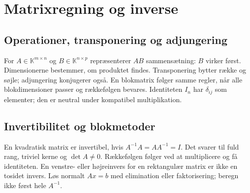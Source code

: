 \section{Matrixregning og inverse}
\subsection{Operationer, transponering og adjungering}
For $A\in\mathbb K^{m\times n}$ og $B\in\mathbb K^{n\times p}$ repræsenterer
$AB$ sammensætning: $B$ virker først. Dimensionerne bestemmer, om produktet findes.
Transponering bytter række og søjle; adjungering konjugerer også.
En blokmatrix følger samme regler, når alle blokdimensioner passer og
rækkefølgen bevares. Identiteten $I_n$ har $\delta_{ij}$ som elementer;
den er neutral under kompatibel multiplikation.

\subsection{Invertibilitet og blokmetoder}
En kvadratisk matrix er invertibel, hvis $A^{-1}A=AA^{-1}=I$.
Det svarer til fuld rang, triviel kerne og $\det A\ne0$.
Rækkefølgen følger ved at multiplicere og få identiteten.
En venstre- eller højreinvers for en rektangulær matrix er ikke en
tosidet invers. Løs normalt $Ax=b$ med elimination eller faktorisering;
beregn ikke først hele $A^{-1}$.

